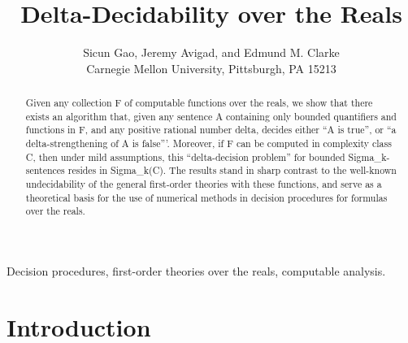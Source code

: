\documentclass[conference]{IEEEtran}
\title{Delta-Decidability over the Reals}
\author{Sicun Gao, Jeremy Avigad, and Edmund M. Clarke\\Carnegie Mellon University, Pittsburgh, PA 15213}
\begin{document}
\maketitle

\begin{abstract}
Given any collection F of computable functions over the reals, we show that there exists an algorithm that, given any sentence A containing only bounded quantifiers and functions in F, and any positive rational number delta, decides either ``A is true'', or ``a delta-strengthening of A is false'''. Moreover, if F can be computed in complexity class C, then under mild assumptions, this ``delta-decision problem'' for bounded Sigma\_k-sentences resides in Sigma\_k(C). The results stand in sharp contrast to the well-known undecidability of the general first-order theories with these functions, and serve as a theoretical basis for the use of numerical methods in decision procedures for formulas over the reals. 

\end{abstract}

{\IEEEkeywords Decision procedures, first-order theories over the reals, computable analysis.}

\section{Introduction}
\end{document}
